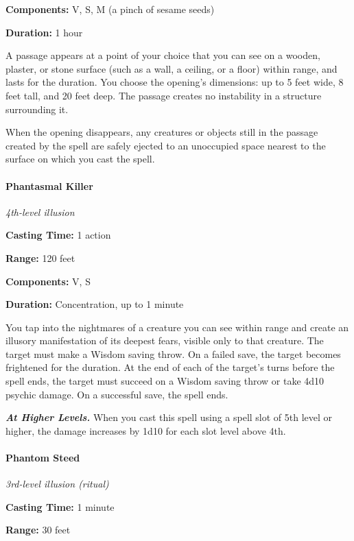 \documentclass[
]{article}
\begin{document}
\textbf{Components:} V, S, M (a pinch of sesame seeds)

\textbf{Duration:} 1 hour

A passage appears at a point of your choice that you can see on a
wooden, plaster, or stone surface (such as a wall, a ceiling, or a
floor) within range, and lasts for the duration. You choose the
opening's dimensions: up to 5 feet wide, 8 feet tall, and 20 feet deep.
The passage creates no instability in a structure surrounding it.

When the opening disappears, any creatures or objects still in the
passage created by the spell are safely ejected to an unoccupied space
nearest to the surface on which you cast the spell.

\hypertarget{phantasmal-killer}{%
\paragraph{Phantasmal Killer}\label{phantasmal-killer}}

\emph{4th-level illusion}

\textbf{Casting Time:} 1 action

\textbf{Range:} 120 feet

\textbf{Components:} V, S

\textbf{Duration:} Concentration, up to 1 minute

You tap into the nightmares of a creature you can see within range and
create an illusory manifestation of its deepest fears, visible only to
that creature. The target must make a Wisdom saving throw. On a failed
save, the target becomes frightened for the duration. At the end of each
of the target's turns before the spell ends, the target must succeed on
a Wisdom saving throw or take 4d10 psychic damage. On a successful save,
the spell ends.

\emph{\textbf{At Higher Levels.}} When you cast this spell using a spell
slot of 5th level or higher, the damage increases by 1d10 for each slot
level above 4th.

\hypertarget{phantom-steed}{%
\paragraph{Phantom Steed}\label{phantom-steed}}

\emph{3rd-level illusion (ritual)}

\textbf{Casting Time:} 1 minute

\textbf{Range:} 30 feet
\end{document}
